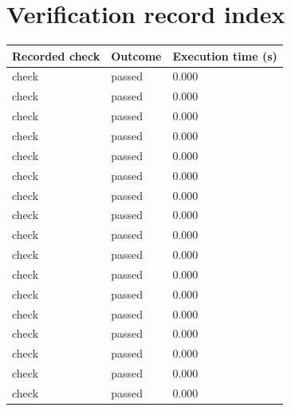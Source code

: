\documentclass[11pt,a4paper]{article}
\begin{document}
\section{Verification record index}

{\small\renewcommand{\arraystretch}{1.18}\begin{longtable}{@{}L{0.57\textwidth}|L{0.16\textwidth}|L{0.17\textwidth}@{}}\toprule

\textbf{Recorded check} & \textbf{Outcome} & \textbf{Execution time (\allowbreak{}s)\allowbreak{}}\\\midrule\endhead

check & passed & 0.000\\[2pt]\hline

check & passed & 0.000\\[2pt]\hline

check & passed & 0.000\\[2pt]\hline

check & passed & 0.000\\[2pt]\hline

check & passed & 0.000\\[2pt]\hline

check & passed & 0.000\\[2pt]\hline

check & passed & 0.000\\[2pt]\hline

check & passed & 0.000\\[2pt]\hline

check & passed & 0.000\\[2pt]\hline

check & passed & 0.000\\[2pt]\hline

check & passed & 0.000\\[2pt]\hline

check & passed & 0.000\\[2pt]\hline

check & passed & 0.000\\[2pt]\hline

check & passed & 0.000\\[2pt]\hline

check & passed & 0.000\\[2pt]\hline

check & passed & 0.000\\[2pt]\hline

check & passed & 0.000\\[2pt]\hline


\end{longtable}}
\end{document}
